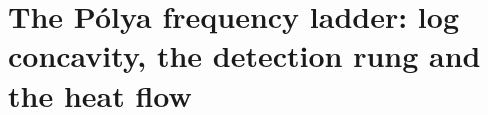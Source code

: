 \chapter{The P\'olya frequency ladder: log concavity, the detection rung and the heat flow}\label{vol3:ch25}

